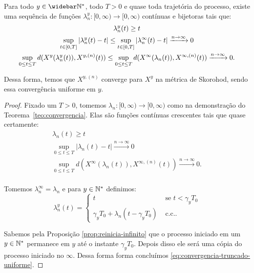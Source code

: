 \begin{corolario}
  \label{cor:convergencia}
  Para todo $y \in \Nzb$, todo $T > 0$ e quase toda trajetória do
  processo, existe uma sequência de funções $\lambda^y_n: [0, \infty) \to
  [0, \infty)$ contínuas  e bijetoras tais que:
  \begin{gather}
    \lambda^y_n(t) \geq t \notag\\
    \label{eq:convergencia-truncado-uniforme}
    \sup_{t \in [0, T]} |\lambda^y_n(t) - t| \leq
    \sup_{t \in [0, T]} |\lambda^\infty_n(t) - t|
    \xrightarrow{n \to \infty} 0\\
    \sup_{0 \leq t \leq T} d(X^y(\lambda_n^y(t)), X^{y, (n)}(t)) \leq
    \sup_{0 \leq t \leq T} d(X^\infty(\lambda_n(t)), X^{\infty, (n)}(t))
    \xrightarrow{n\to\infty} 0. \notag
  \end{gather}
  
  Dessa forma, temos que $X^{y, (n)}$ converge \qc para $X^y$ na
  métrica de Skorohod, sendo essa convergência uniforme em $y$.
\end{corolario}
\begin{proof}
  Fixado um $T > 0$, tomemos $\lambda_n: [0, \infty) \to [0, \infty)$
  como na demonstração do \mbox{Teorema \ref{teo:convergencia}}. Elas
  são funções contínuas crescentes tais que quase certamente:
  \begin{gather*}
    \lambda_n(t) \geq t\\
    \sup_{0 \leq t \leq T} |\lambda_n(t) - t|
    \xrightarrow{n\to\infty} 0 \\
    \sup_{0 \leq t \leq T} d(X^\infty(\lambda_n(t)), X^{\infty, (n)}(t))
    \xrightarrow{n\to\infty} 0. \\
  \end{gather*}

  Tomemos $\lambda^\infty_n = \lambda_n$ e para $y \in {\mathbb{N^*}}$ definimos:
  \begin{displaymath}
    \lambda_n^y(t) = \begin{cases}
      t & \textrm{ se } t < \gamma_y T_0\\
      \gamma_yT_0 + \lambda_n(t - \gamma_y T_0) & \textrm{ c.c.} .
    \end{cases}
  \end{displaymath}


  Sabemos pela Proposição \ref{prop:reinicia-infinito} que o processo
  iniciado em um $y \in {\mathbb{N^*}}$ permanece em $y$ até o instante $\gamma_y
  T_0$. Depois disso ele será uma cópia do processo iniciado no
  $\infty$. Dessa forma forma concluímos
  \eqref{eq:convergencia-truncado-uniforme}.
\end{proof}


